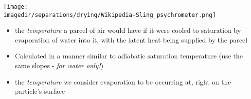 \begin{frame}\frametitle{{\color{purple}{Wet-bulb temperature}}}
	\begin{center}
		\texttt{[image: \\imagedir/separations/drying/Wikipedia-Sling\_psychrometer.png]}
	\end{center}
	\vspace{-6pt}
	\vspace{0pt}
	\begin{itemize}
		\item	the \emph{temperature} a parcel of air would have if it were cooled to saturation by evaporation of water into it, with the latent heat being supplied by the parcel
		\item	Calculated in a manner similar to adiabatic saturation temperature (use the same slopes - \emph{for water only!})
		\item	the \emph{temperature} we consider evaporation to be occurring at, right on the particle's surface
	\end{itemize}


\end{frame}

